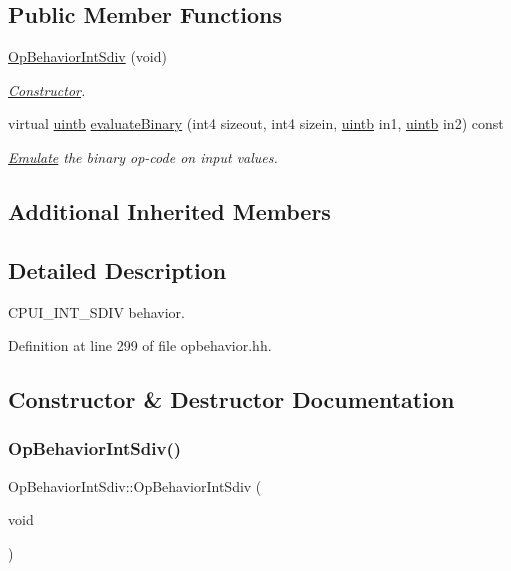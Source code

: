 \subsection*{Public Member Functions}
\begin{DoxyCompactItemize}
\item 
\mbox{\hyperlink{class_op_behavior_int_sdiv_a2c597340165ba5db6d7f8414c848e1c8}{Op\+Behavior\+Int\+Sdiv}} (void)
\begin{DoxyCompactList}\small\item\em \mbox{\hyperlink{class_constructor}{Constructor}}. \end{DoxyCompactList}\item 
virtual \mbox{\hyperlink{types_8h_a2db313c5d32a12b01d26ac9b3bca178f}{uintb}} \mbox{\hyperlink{class_op_behavior_int_sdiv_a8e16d2dd1c72b90b6e2b0d85544d5d11}{evaluate\+Binary}} (int4 sizeout, int4 sizein, \mbox{\hyperlink{types_8h_a2db313c5d32a12b01d26ac9b3bca178f}{uintb}} in1, \mbox{\hyperlink{types_8h_a2db313c5d32a12b01d26ac9b3bca178f}{uintb}} in2) const
\begin{DoxyCompactList}\small\item\em \mbox{\hyperlink{class_emulate}{Emulate}} the binary op-\/code on input values. \end{DoxyCompactList}\end{DoxyCompactItemize}
\subsection*{Additional Inherited Members}


\subsection{Detailed Description}
C\+P\+U\+I\+\_\+\+I\+N\+T\+\_\+\+S\+D\+IV behavior. 

Definition at line 299 of file opbehavior.\+hh.



\subsection{Constructor \& Destructor Documentation}
\mbox{\label{class_op_behavior_int_sdiv_a2c597340165ba5db6d7f8414c848e1c8}} 
\subsubsection{\texorpdfstring{OpBehaviorIntSdiv()}{OpBehaviorIntSdiv()}}
{\footnotesize\ttfamily Op\+Behavior\+Int\+Sdiv\+::\+Op\+Behavior\+Int\+Sdiv (\begin{DoxyParamCaption}\item[{void}]{ }\end{DoxyParamCaption})\hspace{0.3cm}{\ttfamily [inline]}}



